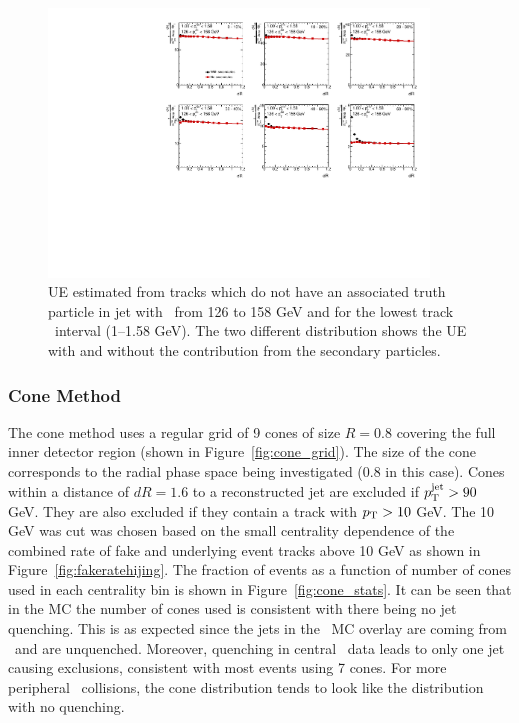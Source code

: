
\begin{figure}
\centering
\includegraphics[width=0.9\textwidth]{figures/main/UE/UE_v_dR_pt1GeV.pdf}
\caption{UE estimated from tracks which do not have an associated truth particle in jet with \pt\ from 126 to 158 GeV and for the lowest track \pt\ interval (1--1.58 GeV).
The two different distribution shows the UE with and without the contribution from the secondary particles.}
\label{fig:UEdR}
\end{figure}   

\subsubsection{Cone Method}
\label{sec:cone_method}
The cone method uses a regular grid of 9 cones of size $R = 0.8$ covering the full inner detector region (shown in Figure~\ref{fig:cone_grid}).
The size of the cone corresponds to the radial phase space being investigated (0.8 in this case).
Cones within a distance of $dR=1.6$ to a reconstructed jet are excluded if $\mbox{$p_{\mathrm{T}}^{\mathrm{jet}}$} > 90$ GeV.
They are also excluded if they contain a track with $\mbox{$p_{\mathrm{T}}$} > 10$ GeV.
The 10 GeV was cut was chosen based on the small centrality dependence of the combined rate of fake and underlying event tracks above 10 GeV as shown in Figure~\ref{fig:fakeratehijing}.
The fraction of events as a function of number of cones used in each centrality bin is shown in Figure~\ref{fig:cone_stats}.
It can be seen that in the MC the number of cones used is consistent with there being no jet quenching.
This is as expected since the jets in the \pbpb\ MC overlay are coming from \pythia\ and are unquenched.
Moreover, quenching in central \pbpb\ data leads to only one jet causing exclusions, consistent with most events using 7 cones.
For more peripheral \pbpb\ collisions, the cone distribution tends to look like the distribution with no quenching.

